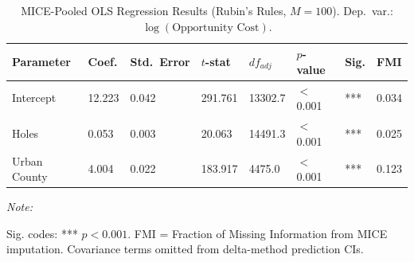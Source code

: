 \begin{table}[!h]
\centering
\caption{\label{tab:regression_results}MICE-Pooled OLS Regression Results (Rubin's Rules, $M = 100$). Dep.\ var.: $\log(\text{Opportunity Cost})$.}
\centering
\fontsize{10}{12}\selectfont
\begin{threeparttable}
\begin{tabular}[t]{llllllll}
\toprule
Parameter & Coef. & Std.\ Error & $t$-stat & $df_{adj}$ & $p$-value & Sig. & FMI\\
\midrule
Intercept & 12.223 & 0.042 & 291.761 & 13302.7 & $<$ 0.001 & *** & 0.034\\
Holes & 0.053 & 0.003 & 20.063 & 14491.3 & $<$ 0.001 & *** & 0.025\\
Urban County & 4.004 & 0.022 & 183.917 & 4475.0 & $<$ 0.001 & *** & 0.123\\
\bottomrule
\end{tabular}
\begin{tablenotes}
\item \textit{Note: } 
\item Sig. codes: *** $p < 0.001$. FMI = Fraction of Missing Information from MICE imputation. Covariance terms omitted from delta-method prediction CIs.
\end{tablenotes}
\end{threeparttable}
\end{table}

